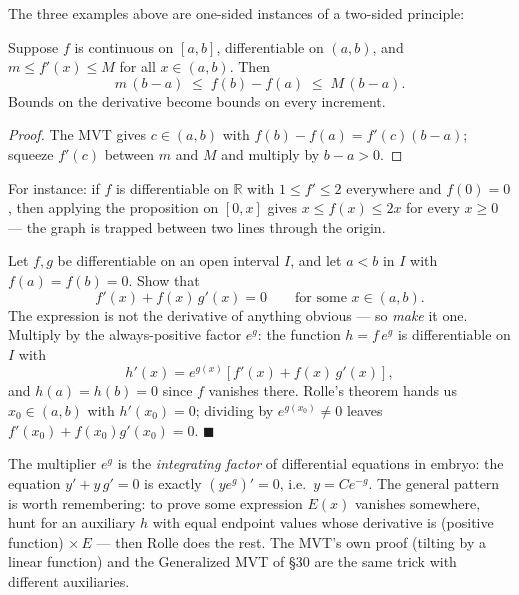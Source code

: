 \documentclass[11pt]{report}
\begin{document}
The three examples above are one-sided instances of a two-sided principle:

\begin{propbox}
Suppose $f$ is continuous on $[a,b]$, differentiable on $(a,b)$, and $m \leq f'(x) \leq M$ for all $x \in (a,b)$. Then
\[
m\,(b-a) \;\leq\; f(b) - f(a) \;\leq\; M\,(b-a).
\]
Bounds on the derivative become bounds on every increment.
\end{propbox}

\begin{proof}
The MVT gives $c \in (a,b)$ with $f(b) - f(a) = f'(c)(b-a)$; squeeze $f'(c)$ between $m$ and $M$ and multiply by $b - a > 0$.
\end{proof}

For instance: if $f$ is differentiable on $\mathbb{R}$ with $1 \leq f' \leq 2$ everywhere and $f(0) = 0$, then applying the proposition on $[0, x]$ gives $x \leq f(x) \leq 2x$ for every $x \geq 0$ --- the graph is trapped between two lines through the origin.

\begin{exbox}
Let $f, g$ be differentiable on an open interval $I$, and let $a < b$ in $I$ with $f(a) = f(b) = 0$. Show that
\[
f'(x) + f(x)\,g'(x) = 0 \qquad \text{for some } x \in (a,b).
\]
The expression is not the derivative of anything obvious --- so \emph{make} it one. Multiply by the always-positive factor $e^{g}$: the function $h = f\, e^{g}$ is differentiable on $I$ with
\[
h'(x) = e^{g(x)} \left[ f'(x) + f(x)\, g'(x) \right],
\]
and $h(a) = h(b) = 0$ since $f$ vanishes there. Rolle's theorem hands us $x_0 \in (a,b)$ with $h'(x_0) = 0$; dividing by $e^{g(x_0)} \neq 0$ leaves $f'(x_0) + f(x_0)g'(x_0) = 0$. \hfill $\blacksquare$
\end{exbox}

\begin{rembox}
The multiplier $e^{g}$ is the \emph{integrating factor} of differential equations in embryo: the equation $y' + y\,g' = 0$ is exactly $(y e^{g})' = 0$, i.e.\ $y = C e^{-g}$. The general pattern is worth remembering: to prove some expression $E(x)$ vanishes somewhere, hunt for an auxiliary $h$ with equal endpoint values whose derivative is (positive function) $\times\, E$ --- then Rolle does the rest. The MVT's own proof (tilting by a linear function) and the Generalized MVT of \S 30 are the same trick with different auxiliaries.
\end{rembox}
\end{document}
